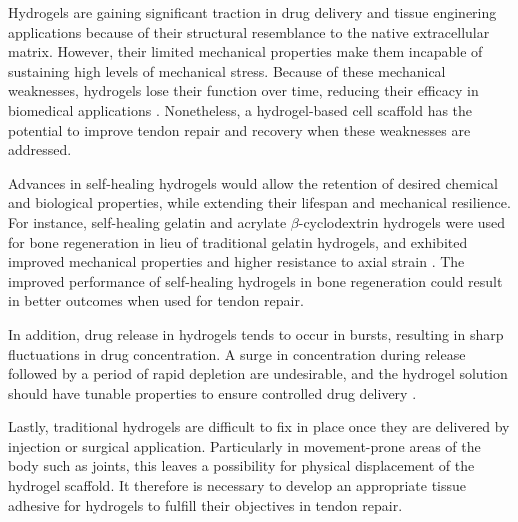 Hydrogels are gaining significant traction in drug delivery and tissue enginering applications because of their structural resemblance to the native extracellular matrix. However, their limited mechanical properties make them incapable of sustaining high levels of mechanical stress.
Because of these mechanical weaknesses, hydrogels lose their function over time, reducing their efficacy in biomedical applications \autocite{rammalAdvancesBiomedicalApplications2021}. Nonetheless, a hydrogel-based cell scaffold has the potential to improve tendon repair and recovery when these weaknesses are addressed.

Advances in self-healing hydrogels would allow the retention of desired chemical and biological properties, while extending their lifespan and mechanical resilience. For instance, self-healing gelatin and acrylate $\beta$-cyclodextrin hydrogels were used for bone regeneration in lieu of traditional gelatin hydrogels, and exhibited improved mechanical properties and higher resistance to axial strain \autocite{rammalAdvancesBiomedicalApplications2021}.
The improved performance of self-healing hydrogels in bone regeneration could result in better outcomes when used for tendon repair.

In addition, drug release in hydrogels tends to occur in bursts, resulting in sharp fluctuations in drug concentration. A surge in concentration during release followed by a period of rapid depletion are undesirable, and the hydrogel solution should have tunable properties to ensure controlled drug delivery \autocite{freedmanEnhancedTendonHealing2022}.

Lastly, traditional hydrogels are difficult to fix in place once they are delivered by injection or surgical application. Particularly in movement-prone areas of the body such as joints, this leaves a possibility for physical displacement of the hydrogel scaffold. It therefore is necessary to develop an appropriate tissue adhesive for hydrogels to fulfill their objectives in tendon repair.